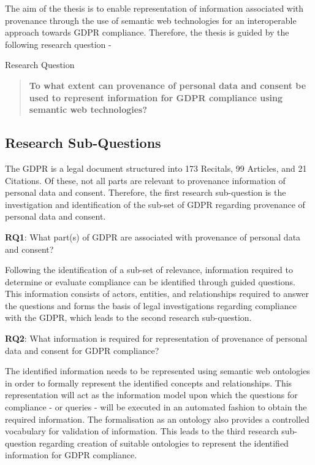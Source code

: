 The aim of the thesis is to enable representation of information associated with provenance through the use of semantic web technologies for an interoperable approach towards GDPR compliance. Therefore, the thesis is guided by the following research question -
\begin{framed}
\small{Research Question}
\begin{quote}
\textbf{To what extent can provenance of personal data and consent be used to represent information for GDPR compliance using semantic web technologies?}
\end{quote}
\end{framed}

\subsection{Research Sub-Questions}
The GDPR is a legal document structured into 173 Recitals, 99 Articles, and 21 Citations. Of these, not all parts are relevant to provenance information of personal data and consent. Therefore, the first research sub-question is the investigation and identification of the sub-set of GDPR regarding provenance of personal data and consent.
\begin{framed}
\textbf{RQ1}: What part(s) of GDPR are associated with provenance of personal data and consent?
\end{framed}
Following the identification of a sub-set of relevance, information required to determine or evaluate compliance can be identified through guided questions. This information consists of actors, entities, and relationships required to answer the questions and forms the basis of legal investigations regarding compliance with the GDPR, which leads to the second research sub-question.
\begin{framed}
\textbf{RQ2}: What information is required for representation of provenance of personal data and consent for GDPR compliance?
\end{framed}
The identified information needs to be represented using semantic web ontologies in order to formally represent the identified concepts and relationships. This representation will act as the information model upon which the questions for compliance - or queries - will be executed in an automated fashion to obtain the required information. The formalisation as an ontology also provides a controlled vocabulary for validation of information. This leads to the third research sub-question regarding creation of suitable ontologies to represent the identified information for GDPR compliance.
